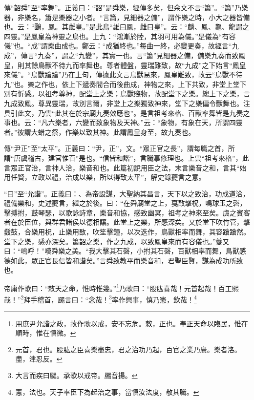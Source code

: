 {\noindent\zhuan{}\fzbyks 傳“韶舜”至“率舞”。正義曰：“韶”是舜樂，經傳多矣，但余文不言“簫”。“簫”乃樂器，非樂名，簫是樂器之小者。“言簫，見細器之備”，謂作樂之時，小大之器皆備也。云：“鶠，鳳。其雌皇。”是此鳥“雄曰鳳，雌曰皇”。云：“麟、鳳、龜、龍謂之四靈。”是鳳皇為神靈之鳥也。上九：“鴻漸於陸，其羽可用為儀。”是儀為“有容儀”也。“成”謂樂曲成也。鄭云：“成猶終也。”每曲一終，必變更奏，故經言“九成”，傳言“九奏”，謂之“九變”，其實一也。言“簫”見細器之備，備樂九奏而致鳳皇，則其餘鳥獸不待九而率舞也。尊者體盤，靈瑞難致，故“九成”之下始言“鳳皇來儀”。“鳥獸蹌蹌”乃在上句，傳據此文言鳥獸易來，鳳皇難致，故云“鳥獸不待九”也。樂之作也，依上下遞奏間合而後曲成，神物之來，上下共致，非堂上堂下別有忻感。以祖考尊神，配堂上之樂；鳥獸賤物，故配堂下之樂。總上下之樂，言九成致鳳。尊異靈瑞，故別言爾，非堂上之樂獨致神來，堂下之樂偏令獸舞也。注具引此文，乃雲“此其在於宗廟九奏效應也”。是言祖考來格、百獸率舞皆是九奏之事也。云：“凡六樂者，六變而致象物及天神。”云：“象物，有象在天，所謂四靈者。”彼謂大蜡之祭，作樂以致其神。此謂鳳皇身至，故九奏也。 \par}

{\noindent\zhuan{}\fzbyks 傳“尹正”至“太平”。正義曰：“尹，正”，文。“眾正官之長”，謂每職之首，所謂“唐虞稽古，建官惟百”是也。“信皆和諧”，言職事修理也。上雲“祖考來格”，此言眾正官治，言神人洽，樂音和也。此篇初說用臣之法，末言樂音之和，言其“始用任賢，立政以禮，治成以樂，所以得致太平”，解史錄夔言之意。 \par}

{\noindent\shu{}\fzkt “曰”至“允諧”。正義曰：、為帝設謀，大聖納其昌言，天下以之致治，功成道洽，禮備樂和，史述夔言，繼之於後。曰：“在舜廟堂之上，戛敔擊柷，鳴球玉之磬，擊搏拊，鼓琴瑟，以歌詠詩章，樂音和協，感致幽冥，祖考之神來至矣。虞之賓客者在於臣位，與群君諸侯以德相讓。此堂上之樂，所感深矣。又於堂下吹竹管，擊鼗鼓，合樂用柷，止樂用敔，吹笙擊鐘，以次迭作，鳥獸相率而舞，其容蹌蹌然。堂下之樂，感亦深矣。簫韶之樂，作之九成，以致鳳皇來而有容儀也。”夔又曰：“嗚呼！”嘆舜樂之美。“我大擊其石磬，小拊其石磬，百獸相率而舞，鳥獸感德如此，眾正官長信皆和諧矣。”言舜致教平而樂音和，君聖臣賢，謀為成功所致也。 \par}

帝庸作歌曰：“敕天之命，惟時惟幾。”\footnote{用庶尹允諧之政，故作歌以戒，安不忘危。敕，正也。奉正天命以臨民，惟在順時，惟在慎微。}乃歌曰：“股肱喜哉！元首起哉！百工熙哉！”\footnote{元首，君也。股肱之臣喜樂盡忠，君之治功乃起，百官之業乃廣。樂者洛。盡，津忍反。}拜手稽首，颺言曰：“念哉！\footnote{大言而疾曰颺。承歌以戒帝。颺音揚。}率作興事，慎乃憲，欽哉！\footnote{憲，法也。天子率臣下為起治之事，當慎汝法度，敬其職。}


